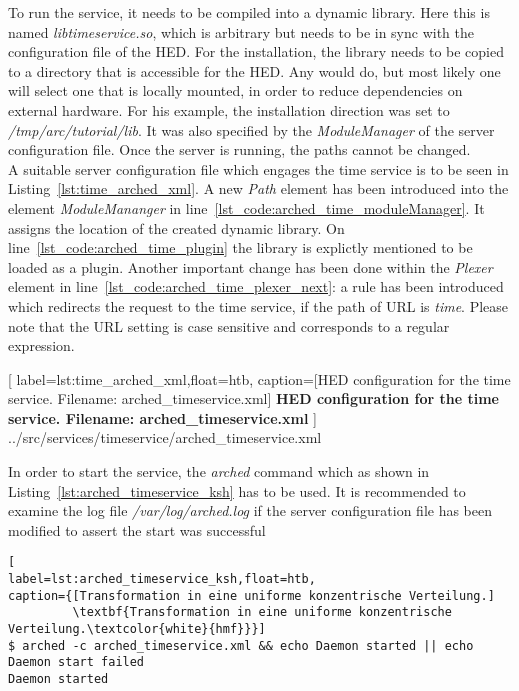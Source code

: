 To run the service, it needs to be compiled into a dynamic library. Here this is named \textit{libtimeservice.so}, which is arbitrary but needs to be in sync with the configuration file of the HED.
For the installation, the library needs to be copied to a directory that is accessible for the HED. Any would do, but most likely one will select one that is locally mounted, in order to reduce dependencies on external hardware. For his example, the installation direction was set to \textit{/tmp/arc/tutorial/lib}. It was also specified by the \textit{ModuleManager} of the server configuration file. 
Once the server is running, the paths cannot be changed.\\


A suitable server configuration file which engages the time service is to be seen in Listing~\ref{lst:time_arched_xml}.
A new \textit{Path} element has been introduced into the element \textit{ModuleMananger} in line~\ref{lst_code:arched_time_moduleManager}.
It assigns the location of the created dynamic library.
On line~\ref{lst_code:arched_time_plugin} the library is explictly mentioned to be loaded as a plugin.
Another important change has been done within the \textit{Plexer} element in line~\ref{lst_code:arched_time_plexer_next}:
a rule has been introduced which redirects the request to the time service, if the path of URL is \textit{time}. 
Please note that the URL setting is case sensitive and corresponds to a regular expression.\\


	[
	label=lst:time_arched_xml,float=htb,
	caption={[HED configuration for the time service. Filename: arched\_timeservice.xml]
	\textbf{HED configuration for the time service. Filename: arched\_timeservice.xml}}
	]
{../src/services/timeservice/arched_timeservice.xml}

In order to start the service, the \textit{arched} command which as shown in Listing~\ref{lst:arched_timeservice_ksh} has to be used.
It is recommended to examine the log file \textit{/var/log/arched.log} if the server configuration file has been modified to  assert the start was successful

\begin{lstlisting}[
label=lst:arched_timeservice_ksh,float=htb,
caption={[Transformation in eine uniforme konzentrische Verteilung.]
         \textbf{Transformation in eine uniforme konzentrische Verteilung.\textcolor{white}{hmf}}}]
$ arched -c arched_timeservice.xml && echo Daemon started || echo Daemon start failed
Daemon started
\end{lstlisting}



